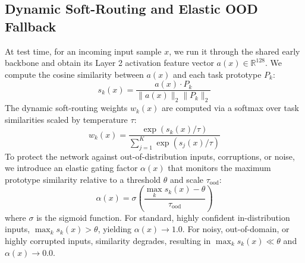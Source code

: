 \documentclass{article}
\theoremstyle{plain}
\theoremstyle{definition}
\theoremstyle{remark}
\begin{document}
\subsection{Dynamic Soft-Routing and Elastic OOD Fallback}
At test time, for an incoming input sample $x$, we run it through the shared early backbone and obtain its Layer 2 activation feature vector $a(x) \in \mathbb{R}^{128}$. We compute the cosine similarity between $a(x)$ and each task prototype $P_k$:
\begin{equation}
    s_k(x) = \frac{a(x) \cdot P_k}{\|a(x)\|_2 \|P_k\|_2}
\end{equation}
The dynamic soft-routing weights $w_k(x)$ are computed via a softmax over task similarities scaled by temperature $\tau$:
\begin{equation}
    w_k(x) = \frac{\exp(s_k(x) / \tau)}{\sum_{j=1}^K \exp(s_j(x) / \tau)}
\end{equation}
To protect the network against out-of-distribution inputs, corruptions, or noise, we introduce an elastic gating factor $\alpha(x)$ that monitors the maximum prototype similarity relative to a threshold $\theta$ and scale $\tau_{\text{ood}}$:
\begin{equation}
    \alpha(x) = \sigma \left( \frac{\max_k s_k(x) - \theta}{\tau_{\text{ood}}} \right)
\end{equation}
where $\sigma$ is the sigmoid function. For standard, highly confident in-distribution inputs, $\max_k s_k(x) > \theta$, yielding $\alpha(x) \to 1.0$. For noisy, out-of-domain, or highly corrupted inputs, similarity degrades, resulting in $\max_k s_k(x) \ll \theta$ and $\alpha(x) \to 0.0$.
\end{document}
